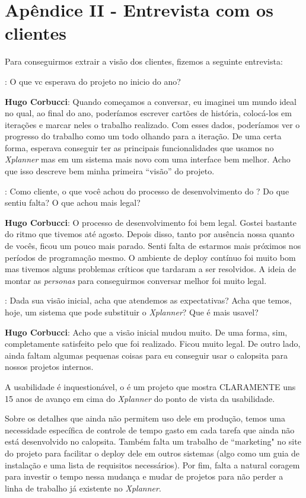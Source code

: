\section{Apêndice II - Entrevista com os clientes}

Para conseguirmos extrair a visão dos clientes, fizemos a seguinte entrevista:

\textbf{\calopsita{}}: O que vc esperava do projeto no inicio do ano?

\textbf{Hugo Corbucci}: Quando começamos a conversar, eu imaginei um mundo ideal no qual, ao final do ano, poderíamos escrever cartões de história, colocá-los em iterações e marcar neles o trabalho realizado. Com esses dados, poderíamos ver o progresso do trabalho como um todo olhando para a iteração. De uma certa forma, esperava conseguir ter as principais funcionalidades que usamos no \textit{Xplanner} mas em um sistema mais novo com uma interface bem melhor. Acho que isso descreve bem minha primeira ``visão'' do projeto.

\textbf{\calopsita{}}: Como cliente, o que você achou do processo de desenvolvimento do \calopsita{}? Do que sentiu falta? O que achou mais legal?

\textbf{Hugo Corbucci}: O processo de desenvolvimento foi bem legal. Gostei bastante do ritmo que tivemos até agosto. Depois disso, tanto por ausência nossa quanto de vocês, ficou um pouco mais parado. Senti falta de estarmos mais próximos nos períodos de programação mesmo. O ambiente de deploy contínuo foi muito bom mas tivemos alguns problemas críticos que tardaram a ser resolvidos. A ideia de montar as \textit{personas} para conseguirmos conversar melhor foi muito legal. 

\textbf{\calopsita{}}: Dada sua visão inicial, acha que atendemos as expectativas? Acha que temos, hoje, um sistema que pode substituir o \textit{Xplanner}? Que é mais usavel?

\textbf{Hugo Corbucci}: Acho que a visão inicial mudou muito. De uma forma, sim, completamente satisfeito pelo que foi realizado. Ficou muito legal. De outro lado, ainda faltam algumas pequenas coisas para eu conseguir usar o calopsita para nossos projetos internos.

A usabilidade é inquestionável, o \calopsita{} é um projeto que mostra CLARAMENTE uns 15 anos de avanço em cima do \textit{Xplanner} do ponto de vista da usabilidade.

Sobre os detalhes que ainda não permitem uso dele em produção, temos uma necessidade específica de controle de tempo gasto em cada tarefa que ainda não está desenvolvido no calopsita. Também falta um trabalho de ``marketing" no site do projeto para facilitar o deploy dele em outros sistemas (algo como um guia de instalação e uma lista de requisitos necessários). Por fim, falta a natural coragem para investir o tempo nessa mudança e mudar de projetos para não perder a linha de trabalho já existente no \textit{Xplanner}.